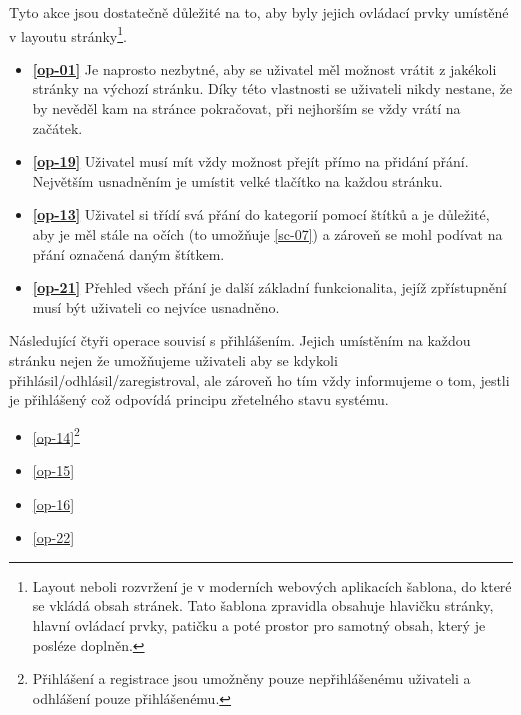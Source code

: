 Tyto akce jsou dostatečně důležité na to, aby byly jejich ovládací prvky umístěné v layoutu stránky\footnote{Layout neboli rozvržení je v moderních webových aplikacích šablona, do které se vkládá obsah stránek. Tato šablona zpravidla obsahuje hlavičku stránky, hlavní ovládací prvky, patičku a poté prostor pro samotný obsah, který je posléze doplněn.}.
\begin{itemize}
\item \textbf{\ref{op-01}} Je naprosto nezbytné, aby se uživatel měl možnost vrátit z jakékoli stránky na výchozí stránku\cite{molich1990improving}. Díky této vlastnosti se uživateli nikdy nestane, že by nevěděl kam na stránce pokračovat, při nejhorším se vždy vrátí na začátek.
\item \textbf{\ref{op-19}} Uživatel musí mít vždy možnost přejít přímo na přidání přání. Největším usnadněním je umístit velké tlačítko na každou stránku.
\item \textbf{\ref{op-13}} Uživatel si třídí svá přání do kategorií pomocí štítků a je důležité, aby je měl stále na očích (to umožňuje \ref{sc-07}) a zároveň se mohl podívat na přání označená daným štítkem.
\item \textbf{\ref{op-21}} Přehled všech přání je další základní funkcionalita, jejíž zpřístupnění musí být uživateli co nejvíce usnadněno.
\end{itemize}
Následující čtyři operace souvisí s přihlášením. Jejich umístěním na každou stránku nejen že umožňujeme uživateli aby se kdykoli přihlásil/odhlásil/zaregistroval, ale zároveň ho tím vždy informujeme o tom, jestli je přihlášený což odpovídá principu zřetelného stavu systému\cite{molich1990improving}.
\begin{multicols}{2}
\begin{itemize}
\item \ref{op-14}\footnote{Přihlášení a registrace jsou umožněny pouze nepřihlášenému uživateli a odhlášení pouze přihlášenému.\label{footnote-login}}
\item \ref{op-15}
\item \ref{op-16}
\item \ref{op-22}
\end{itemize}
\end{multicols}


